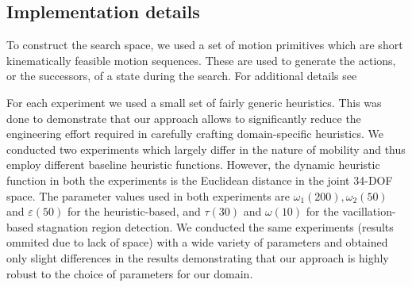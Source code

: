 \documentclass{article}
\begin{document}
\subsection{Implementation details}
To construct the search space, we used a set of motion primitives which are short kinematically feasible motion sequences. 
These are used to generate the actions, or the successors, of a state during the search. 
For additional details see~\cite{DL18}


For each experiment we used a small set of fairly generic heuristics. 
This was done to demonstrate that our approach allows to significantly reduce the engineering effort required in carefully crafting domain-specific heuristics. 
We conducted two experiments which largely differ in the nature of mobility and thus employ different baseline heuristic functions. 
However, the dynamic heuristic function in both the experiments is the Euclidean distance in the joint 34-DOF space.
The parameter values used in both experiments are $\omega_1 (200), \omega_2 (50)$ and $\varepsilon (50)$ for the heuristic-based, and $\tau (30)$ and $\omega (10)$ for the vacillation-based stagnation region detection.
We conducted the same experiments (results ommited due to lack of space) with a wide variety of parameters and obtained  only slight differences in the results demonstrating that our approach is highly robust to the choice of parameters for our domain.
\end{document}
